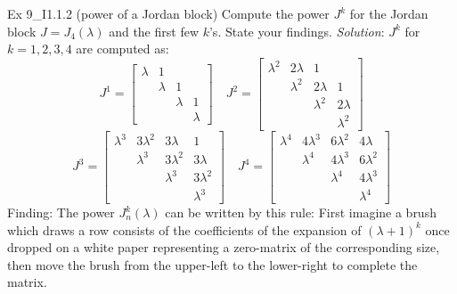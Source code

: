 \documentclass{article}
\begin{document}
\begin{Th}{Ex 9\_I1.1.2 (power of a Jordan block)}
    Compute the power $J^k$ for the Jordan block $J=J_{4}(\lambda)$ and the first few $k$'s. State your findings.
    \tcblower
    \textit{Solution}: $J^k$ for $k=1,2,3,4$ are computed as:
    $$ J^1 = 
    \begin{bmatrix}
        \lambda & 1 & & \\
        & \lambda & 1 & \\
        & & \lambda & 1 \\
        & & & \lambda
    \end{bmatrix} \quad J^2 =
    \begin{bmatrix}
        \lambda^2 & 2\lambda & 1 & \\
        & \lambda^2 & 2\lambda & 1 \\
        & & \lambda^2 & 2\lambda \\
        & & & \lambda^2
    \end{bmatrix}
    $$
    $$
    J^3 = 
    \begin{bmatrix}
        \lambda^3 & 3\lambda^2 & 3\lambda & 1 \\
        & \lambda^3 & 3\lambda^2 & 3\lambda \\
        & & \lambda^3 & 3\lambda^2 \\
        & & & \lambda^3
    \end{bmatrix} \quad J^4 = 
    \begin{bmatrix}
        \lambda^4 & 4\lambda^3 & 6\lambda^2 & 4\lambda \\
        & \lambda^4 & 4\lambda^3 & 6\lambda^2 \\
        & & \lambda^4 & 4\lambda^3 \\
        & & & \lambda^4
    \end{bmatrix}
    $$
    Finding: \textcolor{Th}{The power $J_n^k(\lambda)$ can be written by this rule: First imagine a brush which draws a row consists of the coefficients of the expansion of $(\lambda+1)^k$ once dropped on a white paper representing a zero-matrix of the corresponding size, then move the brush from the upper-left to the lower-right to complete the matrix.}
\end{Th}
\end{document}
